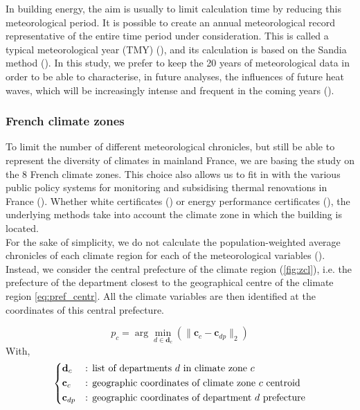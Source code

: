 \documentclass[11pt]{article}
\begin{document}
        In building energy, the aim is usually to limit calculation time by reducing this meteorological period. It is possible to create an annual meteorological record representative of the entire time period under consideration. This is called a typical meteorological year (TMY) (\cite{wilcox_users_2008}), and its calculation is based on the Sandia method (\cite{hall_generation_1978}). In this study, we prefer to keep the 20 years of meteorological data in order to be able to characterise, in future analyses, the influences of future heat waves, which will be increasingly intense and frequent in the coming years (\cite{ouzeau_heat_2016}).


        \subsubsection{French climate zones} %
        \label{ssub:french_climate_zones}

        To limit the number of different meteorological chronicles, but still be able to represent the diversity of climates in mainland France, we are basing the study on the 8 French climate zones. This choice also allows us to fit in with the various public policy systems for monitoring and subsidising thermal renovations in France (\cite{anah_aides_2024}). Whether white certificates (\cite{ademe_french_2011}) or energy performance certificates (\cite{ministere_de_la_transition_ecologique_methode_2021}), the underlying methods take into account the climate zone in which the building is located. \\

        For the sake of simplicity, we do not calculate the population-weighted average chronicles of each climate region for each of the meteorological variables (\cite{cros_comparative_2025}). Instead, we consider the central prefecture of the climate region (\ref{fig:zcl}), i.e. the prefecture of the department closest to the geographical centre of the climate region \eqref{eq:pref_centr}. All the climate variables are then identified at the coordinates of this central prefecture. 

        \begin{equation}
            \label{eq:pref_centr}
            p_c = \arg \min_{d \in \mathbf{d}_c} \left(\|\mathbf{c}_c - \mathbf{c}_{dp}\|_2 \right)
        \end{equation}
        With,
        $$
        \begin{dcases}
            \mathbf{d}_c&\text{: list of departments $d$ in climate zone $c$}\\
            \mathbf{c}_c&\text{: geographic coordinates of climate zone $c$ centroid}\\
            \mathbf{c}_{dp}&\text{: geographic coordinates of department $d$ prefecture}\\
        \end{dcases}
        $$
\end{document}
